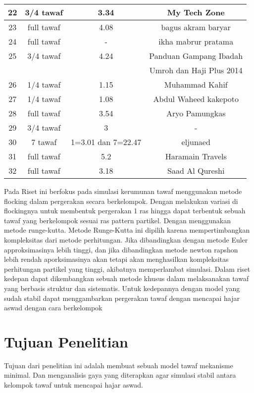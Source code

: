 \begin{table}[H]
\begin{tabular}{|c|c|c|c|}
\hline
22&3/4 tawaf&	3.34&My Tech Zone\\
\hline
23&full tawaf&	4.08&bagus akram baryar\\

\hline
24&full tawaf&	-&ikha mabrur pratama\\

\hline
25&3/4 tawaf&	4.24&Panduan Gampang Ibadah \\
& & &Umroh dan Haji  Plus 2014\\
	
\hline
26&1/4 tawaf &	1.15&Muhammad Kahif\\

\hline
27&1/4 tawaf &	1.08&Abdul Waheed kakepoto\\
	
\hline
28&full tawaf&	3.54&	Aryo Pamungkas\\

\hline
29&3/4 tawaf&	3&-\\

\hline
30&7 tawaf&	1=3.01 dan 7=22.47&eljunaed\\
\hline
31&full tawaf&	5.2&Haramain Travels\\

\hline
32&full tawaf&	3.18&Saad Al Qureshi\\
\hline

\end{tabular}
\end{table}

		
\hspace{0.6cm}Pada Riset ini berfokus pada simulasi kerumunan tawaf menggunakan metode flocking dalam pergerakan secara berkelompok. Dengan melakukan variasi di flockingnya untuk membentuk pergerakan 1 ras hingga dapat terbentuk sebuah tawaf yang berkelompok sesuai ras pattern partikel. Dengan menggunakan metode runge-kutta. Metode Runge-Kutta ini dipilih karena mempertimbangkan kompleksitas dari metode perhitungan. Jika dibandingkan dengan metode Euler approksimasinya lebih tinggi, dan jika dibandingkan metode newton rapshon lebih rendah aporksimasinya akan tetapi akan menghasilkan kompleksitas perhitungan partikel yang tinggi, akibatnya memperlambat simulasi.
Dalam riset kedepan dapat dikembangkan sebuah metode khusus dalam melaksanakan tawaf yang berbasis struktur dan sistematis. Untuk kedepannya dengan model yang sudah stabil dapat menggambarkan pergerakan tawaf dengan mencapai hajar aswad dengan cara berkelompok   

\section{Tujuan Penelitian}\label{sec:tujuan}
\hspace{0.6cm}Tujuan dari penelitian ini adalah membuat sebuah model tawaf mekanisme minimal. Dan menganalisis gaya yang diterapkan agar simulasi stabil antara kelompok tawaf untuk mencapai hajar aswad.

